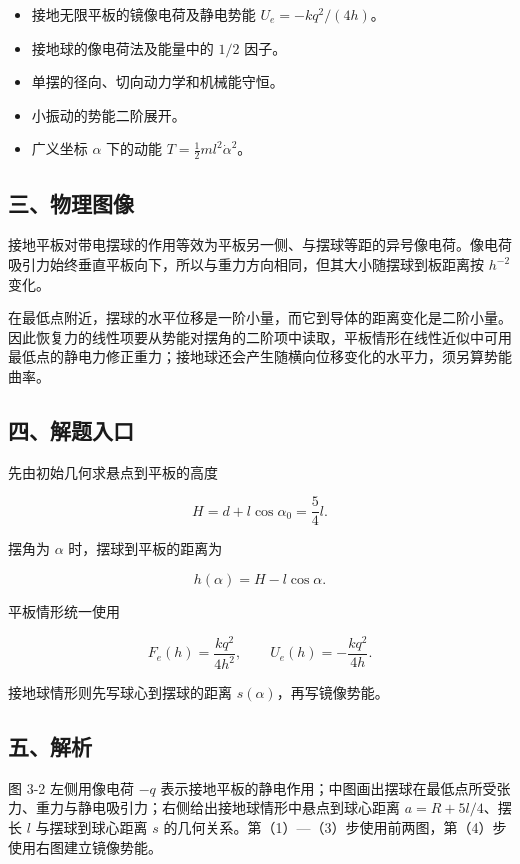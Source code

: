 \documentclass[12pt,a4paper,UTF8]{ctexart}
\newcommand{\tightlist}{\setlength{\itemsep}{0pt}\setlength{\parskip}{0pt}}
\begin{document}
\begin{itemize}
\tightlist
\item
  接地无限平板的镜像电荷及静电势能 \(U_e=-kq^2/(4h)\)。
\item
  接地球的像电荷法及能量中的 \(1/2\) 因子。
\item
  单摆的径向、切向动力学和机械能守恒。
\item
  小振动的势能二阶展开。
\item
  广义坐标 \(\alpha\) 下的动能 \(T=\frac12ml^2\dot\alpha^2\)。
\end{itemize}

\subsection{三、物理图像}\label{ux4e09ux7269ux7406ux56feux50cf-2}

接地平板对带电摆球的作用等效为平板另一侧、与摆球等距的异号像电荷。像电荷吸引力始终垂直平板向下，所以与重力方向相同，但其大小随摆球到板距离按
\(h^{-2}\) 变化。

在最低点附近，摆球的水平位移是一阶小量，而它到导体的距离变化是二阶小量。因此恢复力的线性项要从势能对摆角的二阶项中读取，平板情形在线性近似中可用最低点的静电力修正重力；接地球还会产生随横向位移变化的水平力，须另算势能曲率。

\subsection{四、解题入口}\label{ux56dbux89e3ux9898ux5165ux53e3-2}

先由初始几何求悬点到平板的高度

\[H=d+l\cos\alpha_0=\frac54l.\]

摆角为 \(\alpha\) 时，摆球到平板的距离为

\[h(\alpha)=H-l\cos\alpha.\]

平板情形统一使用

\[F_e(h)=\frac{kq^2}{4h^2},\qquad U_e(h)=-\frac{kq^2}{4h}.\]

接地球情形则先写球心到摆球的距离 \(s(\alpha)\)，再写镜像势能。

\subsection{五、解析}\label{ux4e94ux89e3ux6790-2}

图 3-2 左侧用像电荷 \(-q\)
表示接地平板的静电作用；中图画出摆球在最低点所受张力、重力与静电吸引力；右侧给出接地球情形中悬点到球心距离
\(a=R+5l/4\)、摆长 \(l\) 与摆球到球心距离 \(s\)
的几何关系。第（1）---（3）步使用前两图，第（4）步使用右图建立镜像势能。
\end{document}
